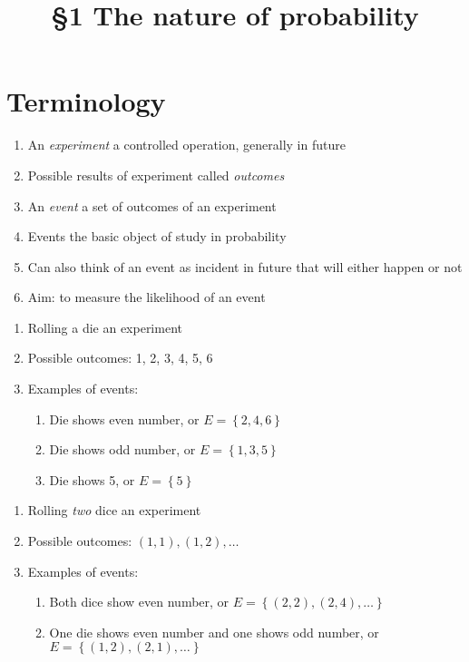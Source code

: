 \documentclass{ximera}
\title{\S1 The nature of probability}
\begin{document}
\maketitle

\section{Terminology}
\begin{enumerate}
\item An {\em experiment} a controlled operation,
generally in future
\item Possible results of experiment called {\em outcomes}
\item An {\em event} a set of outcomes of an experiment
\item Events the basic object of study in probability
\item Can also think of an event as incident in future
that will either happen or not
\item Aim: to measure the likelihood of an event
\end{enumerate}

\begin{example}
\begin{enumerate}
\item Rolling a die an experiment
\item Possible outcomes: 1, 2, 3, 4, 5, 6
\item Examples of events:
\begin{enumerate}
\item Die shows even number, or $E=\left\{2,4,6\right\}$
\item Die shows odd number, or $E=\left\{1,3,5\right\}$
\item Die shows 5, or $E=\left\{5\right\}$
\end{enumerate}
\end{enumerate}
\end{example}

\begin{example}
\begin{enumerate}
\item Rolling {\em two} dice an experiment
\item Possible outcomes: $\left(1,1\right),\left(1,2\right),\ldots$
\item Examples of events:
\begin{enumerate}
\item Both dice show even number, or $E=\left\{\left(2,2\right),
\left(2,4\right),\ldots\right\}$
\item One die shows even number and one shows odd number,
or $E=\left\{\left(1,2\right),\left(2,1\right),\ldots\right\}$
\end{enumerate}
\end{enumerate}
\end{example}
\end{document}
